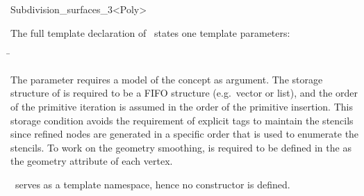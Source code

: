 \begin{ccRefClass}{Subdivision_surfaces_3<Poly>}


\ccParameters

The full template declaration of \ccClassTemplateName\ states one
template parameters:

\begin{tabbing}
 \= 
\end{tabbing}
   
The parameter  requires a model of 
the  concept as argument. The storage structure
of  is required to be a FIFO structure (e.g.~vector 
or list), and the order of the primitive iteration is assumed in the order
of the primitive insertion. This storage condition avoids the requirement 
of explicit tags to maintain the stencils since refined nodes are 
generated in a specific order that is used to enumerate the stencils. 
To work on the geometry smoothing, 
 is required to be defined in the  as the 
geometry attribute of each vertex.








\ccCreation
{}

\ccClassTemplateName\ serves as a template namespace, hence no constructor
is defined. 




\end{ccRefClass}
